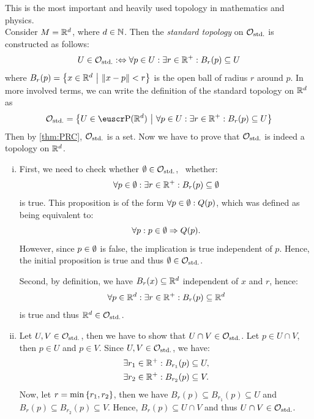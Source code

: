\begin{example}
	This is the most important and heavily used topology in mathematics and physics.\\
	Consider \(M = \mathbb R^d\), where \(d \in \mathbb N\). Then the \emph{standard topology} on \(\mathcal{O}_{\text{std.}}\) is constructed as follows:
	\begin{equation*}
		U \in \mathcal{O}_{\text{std.}} :\Leftrightarrow \forall p \in U: \exists r \in \mathbb R^+: B_r(p) \subseteq U \label{eq:standard_topology}
	\end{equation*}
	where \(B_r(p) = \qty{x \in \mathbb R^d \ \middle|\ \norm{x - p} < r}\) is the open ball of radius \(r\) around \(p\). In more involved terms, we can write the definition of the standard topology on \(\mathbb R^d\) as
	\begin{equation*}
		\COstd = \qty{U \in \powerset(\R^d) \mid \forall p \in U: \exists r \in \R^+: B_r(p) \subseteq U} \label{eq:standard_topology_explicit}
	\end{equation*}
	Then by \cref{thm:PRC}, \(\mathcal{O}_{\text{std.}}\) is a set. Now we have to prove that \(\mathcal{O}_{\text{std.}}\) is indeed a topology on \(\mathbb R^d\).
	\begin{enumerate}[(i)]
		\item First, we need to check whether \(\emptyset \in \mathcal{O}_{\text{std.}}\), \ie\ whether:
		      \begin{equation*}
			      \forall p \in \emptyset : \exists r \in \mathbb R^+ : B_r(p) \subseteq \emptyset
		      \end{equation*}
		      is true. This proposition is of the form \(\forall p \in \emptyset : Q(p)\), which was defined as being equivalent to:
		      \begin{equation*}
			      \forall p : p \in \emptyset \Rightarrow Q(p).
		      \end{equation*}
		      However, since \(p \in \emptyset\) is false, the implication is true independent of \(p\). Hence, the initial proposition is true and thus \(\emptyset \in \mathcal{O}_{\text{std.}}\).

		      Second, by definition, we have \(B_r(x) \subseteq \mathbb R^d\) independent of \(x\) and \(r\), hence:
		      \begin{equation*}
			      \forall p \in \mathbb R^d : \exists r \in \mathbb R^+ : B_r(p) \subseteq \mathbb R^d
		      \end{equation*}
		      is true and thus \(\mathbb R^d\in\mathcal{O}_{\text{std.}}\).

		\item Let \(U, V \in \mathcal{O}_{\text{std.}}\), then we have to show that \(U\cap V\in\mathcal{O}_{\text{std.}}\). Let \(p \in U\cap V\), then \(p \in U\) and \(p \in V\). Since \(U, V \in \mathcal{O}_{\text{std.}}\), we have:
		      \begin{align*}
			      \exists r_1 \in \mathbb R^+ : B_{r_1}(p) & \subseteq U, \\
			      \exists r_2 \in \mathbb R^+ : B_{r_2}(p) & \subseteq V.
		      \end{align*}
		      Now, let \(r = \min\qty{r_1, r_2}\), then we have \(B_r(p) \subseteq B_{r_1}(p) \subseteq U\) and \(B_r(p) \subseteq B_{r_2}(p) \subseteq V\). Hence, \(B_r(p) \subseteq U\cap V\) and thus \(U\cap V\in\mathcal{O}_{\text{std.}}\).


\end{enumerate}
\end{example}
